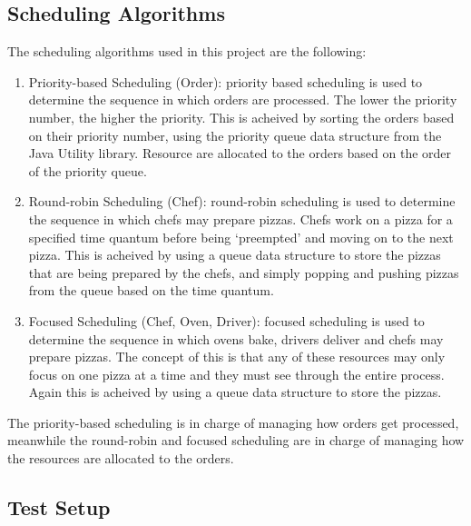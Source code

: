 \documentclass[conference]{IEEEtran}
\begin{document}
\subsection{Scheduling Algorithms}
The scheduling algorithms used in this project are the following:
\begin{enumerate}
    \item Priority-based Scheduling (Order): priority based scheduling is used to determine the sequence in which orders are processed. The lower the priority number, the higher the priority. This is acheived by sorting the orders based on their priority number, using the priority queue data structure from the Java Utility library. Resource are allocated to the orders based on the order of the priority queue.
    \item Round-robin Scheduling (Chef): round-robin scheduling is used to determine the sequence in which chefs may prepare pizzas. Chefs work on a pizza for a specified time quantum before being `preempted' and moving on to the next pizza. This is acheived by using a queue data structure to store the pizzas that are being prepared by the chefs, and simply popping and pushing pizzas from the queue based on the time quantum.
    \item Focused Scheduling (Chef, Oven, Driver): focused scheduling is used to determine the sequence in which ovens bake, drivers deliver and chefs may prepare pizzas. The concept of this is that any of these resources may only focus on one pizza at a time and they must see through the entire process. Again this is acheived by using a queue data structure to store the pizzas. 
\end{enumerate}

The priority-based scheduling is in charge of managing how orders get processed, meanwhile the round-robin and focused scheduling are in charge of managing how the resources are allocated to the orders. 

\subsection{Test Setup}
\end{document}
